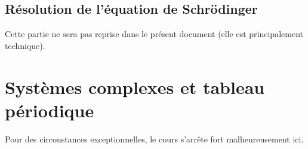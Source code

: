 \subsection{Résolution de l'équation de Schrödinger}
Cette partie ne sera pas reprise dans le présent document (elle est principalement technique).


\section{Systèmes complexes et tableau périodique}
Pour des circonstances exceptionnelles, le cours s'arrête fort malheureusement ici.

